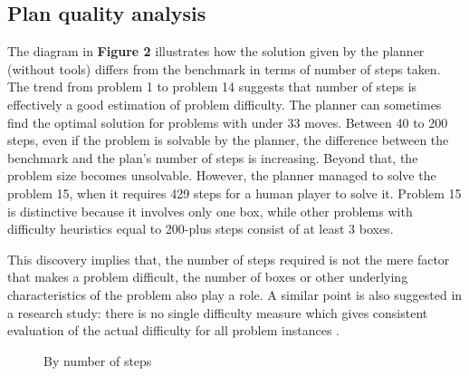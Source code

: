 \documentclass[letterpaper]{article} %
\begin{document}
\subsection{Plan quality analysis}
The diagram in \textbf{Figure 2} illustrates how the solution given by the
planner (without tools) differs from the benchmark in terms of number
of steps taken. The trend from problem 1 to problem 14
suggests that number of steps is effectively a good estimation of
problem difficulty. The planner can sometimes find the
optimal solution for problems with under 33 moves.
Between 40 to 200 steps, even if the problem is solvable
by the planner, the difference between the benchmark and the
plan's number of steps is increasing.
Beyond that, the problem size becomes
unsolvable. However, the planner managed to solve the
problem 15, when it requires 429 steps for a human player
to solve it.
Problem 15 is distinctive because
it involves only one box, while other problems with difficulty
heuristics equal to
200-plus steps consist of at least 3 boxes.

This discovery implies that, the number of steps required is not
the mere factor that makes a problem difficult, the number of boxes
or other underlying characteristics of the problem also play a role.
A similar point is also suggested in a research study:
there is no single difficulty measure which gives consistent
evaluation of the actual difficulty for all problem instances
\cite{difficulty-rating}.
\datatableentry
\begin{figure}
\caption{By number of steps}
\end{figure}
\end{document}
